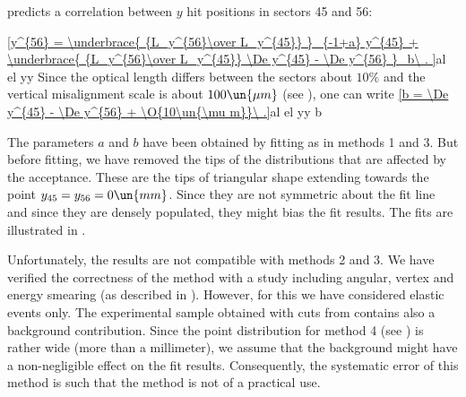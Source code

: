 

 predicts a correlation between $y$ hit positions in sectors 45 and 56:

\eqref{y^{56} =
	\underbrace{ {L_y^{56}\over L_y^{45}} }_{-1+a}  y^{45}
	+ \underbrace{ {L_y^{56}\over L_y^{45}} \De y^{45} - \De y^{56} }_b\ .
}{al el yy}
Since the optical length differs between the sectors about $10\percent$ and the vertical misalignment scale is about $100\un{\mu m}$  (see ), one can write
\eqref{b = \De y^{45} - \De y^{56} + \O{10\un{\mu m}}\ .}{al el yy b}

The parameters $a$ and $b$ have been obtained by fitting as in methods 1 and 3. But before fitting, we have removed the tips of the distributions that are affected by the acceptance. These are the tips of triangular shape extending towards the point $y_{45} = y_{56} = 0\un{mm}$. Since they are not symmetric about the fit line and since they are densely populated, they might bias the fit results. The fits are illustrated in .


Unfortunately, the results are not compatible with methods 2 and 3. We have verified the correctness of the method with a  study including angular, vertex and energy smearing (as described in ). However, for this  we have considered elastic events only. The experimental sample obtained with cuts from  contains also a background contribution. Since the point distribution for method 4 (see ) is rather wide (more than a millimeter), we assume that the background might have a non-negligible effect on the fit results. Consequently, the systematic error of this method is such that the method is not of a practical use.

